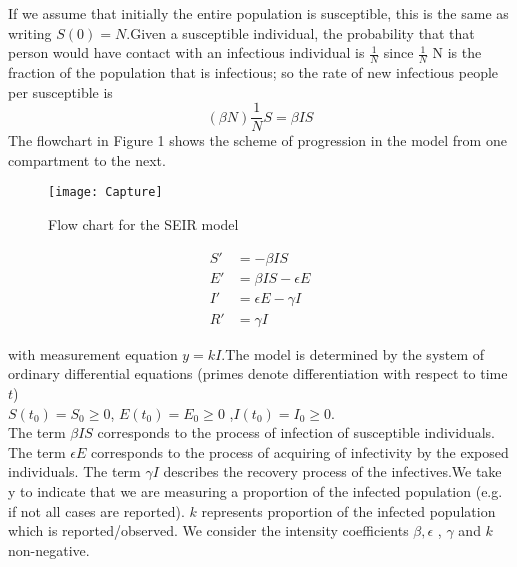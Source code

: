 \documentclass{exam}
\begin{document}
\begin{itemize}
	If we assume that initially the entire population is susceptible, this is the same as writing $S(0) = N$.Given a susceptible individual, the probability that that person would have contact with an infectious individual is $\frac{1}{N}$ since $\frac{1}{N}$ N is the fraction of the population that is infectious; so the rate of new infectious people per susceptible is 
	\begin{equation}
	(\beta N) \frac{1}{N}S = \beta I S
	\end{equation}
The flowchart in Figure 1 shows the scheme of progression in the model from one compartment to the next.\\

\begin{figure*}
\texttt{[image: Capture]}
\caption{Flow chart for the SEIR model}
\end{figure*}

	\begin{align}
	S'&= -\beta I S	\\
	E'&= \beta I S-\epsilon E\\
	I'&=\epsilon E -\gamma I\\
	R'&=\gamma I
	\end{align}
	
with measurement equation $y = kI$.The model is determined by the system of ordinary differential equations (primes denote differentiation with respect to time $t$)\\
$S(t_0) =S_0 \geq 0$, $E(t_0) =E_0 \geq 0$	,$ I(t_0) =I_0 \geq 0$.\\
The term $\beta I S$ corresponds to the process of infection of susceptible individuals.
The term $\epsilon E$ corresponds to the process of acquiring of infectivity by the exposed individuals. The term $\gamma I$ describes the recovery process of the infectives.We take y to indicate that we are measuring a proportion of the infected population (e.g. if not all cases are reported). $k$ represents proportion of the infected population which is reported/observed. We consider the intensity coefficients $\beta,\epsilon$ , $\gamma$ and $k$  non-negative.\\


\end{itemize}
\end{document}
